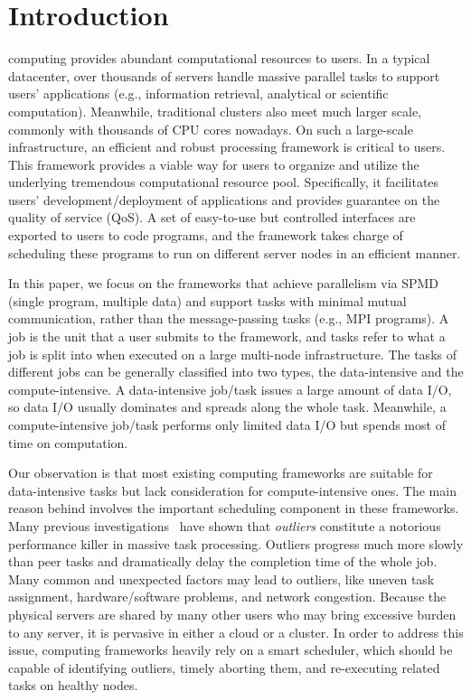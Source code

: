 \section{Introduction}

 computing provides abundant computational resources to users. In a typical datacenter, over thousands of servers handle massive parallel tasks to support users' applications (e.g., information retrieval, analytical or scientific computation). Meanwhile, traditional clusters also meet much larger scale, commonly with thousands of CPU cores nowadays. On such a large-scale infrastructure, an efficient and robust processing framework is critical to users. This framework provides a viable way for users to organize and utilize the underlying tremendous computational resource pool. Specifically, it facilitates users' development/deployment of applications and provides guarantee on the quality of service (QoS). A set of easy-to-use but controlled interfaces are exported to users to code programs, and the framework takes charge of scheduling these programs to run on different server nodes in an efficient manner.

In this paper, we focus on the frameworks that achieve parallelism via SPMD (single program, multiple data) and support tasks with minimal mutual communication, rather than the message-passing tasks (e.g., MPI programs). A job is the unit that a user submits to the framework, and tasks refer to what a job is split into when executed on a large multi-node infrastructure. The tasks of different jobs can be generally classified into two types, the data-intensive and the compute-intensive. A data-intensive job/task issues a large amount of data I/O, so data I/O usually dominates and spreads along the whole task. Meanwhile, a compute-intensive job/task performs only limited data I/O but spends most of time on computation.

Our observation is that most existing computing frameworks are suitable for data-intensive tasks but lack consideration for compute-intensive ones. The main reason behind involves the important scheduling component in these frameworks. Many previous investigations~\cite{Zaharia:2008:IMP:1855741.1855744, Ananthanarayanan:2010:ROM:1924943.1924962} have shown that \textit{outliers} constitute a notorious performance killer in massive task processing. Outliers progress much more slowly than peer tasks and dramatically delay the completion time of the whole job. Many common and unexpected factors may lead to outliers, like uneven task assignment, hardware/software problems, and network congestion. Because the physical servers are shared by many other users who may bring excessive burden to any server, it is pervasive in either a cloud or a cluster. In order to address this issue, computing frameworks heavily rely on a smart scheduler, which should be capable of identifying outliers, timely aborting them, and re-executing related tasks on healthy nodes.

